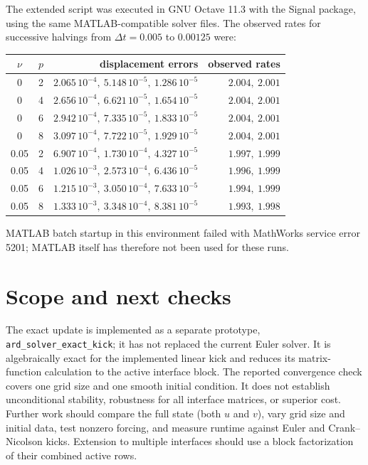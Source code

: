 \documentclass[10pt]{article}
\begin{document}
The extended script was executed in GNU Octave 11.3 with the Signal
package, using the same MATLAB-compatible solver files. The observed rates
for successive halvings from $\Delta t=0.005$ to $0.00125$ were:
\begin{center}
\begin{tabular}{crrr}
\toprule
$\nu$ & $p$ & displacement errors & observed rates\\
\midrule
0 & 2 & $2.065\,10^{-4},\ 5.148\,10^{-5},\ 1.286\,10^{-5}$ & $2.004,\ 2.001$\\
0 & 4 & $2.656\,10^{-4},\ 6.621\,10^{-5},\ 1.654\,10^{-5}$ & $2.004,\ 2.001$\\
0 & 6 & $2.942\,10^{-4},\ 7.335\,10^{-5},\ 1.833\,10^{-5}$ & $2.004,\ 2.001$\\
0 & 8 & $3.097\,10^{-4},\ 7.722\,10^{-5},\ 1.929\,10^{-5}$ & $2.004,\ 2.001$\\
0.05 & 2 & $6.907\,10^{-4},\ 1.730\,10^{-4},\ 4.327\,10^{-5}$ & $1.997,\ 1.999$\\
0.05 & 4 & $1.026\,10^{-3},\ 2.573\,10^{-4},\ 6.436\,10^{-5}$ & $1.996,\ 1.999$\\
0.05 & 6 & $1.215\,10^{-3},\ 3.050\,10^{-4},\ 7.633\,10^{-5}$ & $1.994,\ 1.999$\\
0.05 & 8 & $1.333\,10^{-3},\ 3.348\,10^{-4},\ 8.381\,10^{-5}$ & $1.993,\ 1.998$\\
\bottomrule
\end{tabular}
\end{center}
MATLAB batch startup in this environment failed with MathWorks service
error 5201; MATLAB itself has therefore not been used for these runs.

\section{Scope and next checks}
The exact update is implemented as a separate prototype,
\texttt{ard\_solver\_exact\_kick}; it has not replaced the current Euler
solver. It is algebraically exact for the implemented linear kick and
reduces its matrix-function calculation to the active interface block. The
reported convergence check covers one grid size and one smooth initial
condition. It does not establish unconditional stability, robustness for
all interface matrices, or superior cost. Further work should compare the
full state (both $u$ and $v$), vary grid size and initial data, test
nonzero forcing, and measure runtime against Euler and Crank--Nicolson
kicks. Extension to multiple interfaces should use a block factorization
of their combined active rows.
\end{document}
